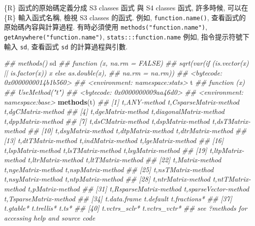 \documentclass[
]{book}
\newenvironment{Shaded}{\begin{snugshade}}{\end{snugshade}}
\newcommand{\CommentTok}[1]{\textcolor[rgb]{0.56,0.35,0.01}{\textit{#1}}}
\newcommand{\KeywordTok}[1]{\textcolor[rgb]{0.13,0.29,0.53}{\textbf{#1}}}
\newcommand{\NormalTok}[1]{#1}
\begin{document}
\{R\} 函式的原始碼定義分成
S3 classes 函式 與 S4 classes 函式,
許多時候, 可以在 \{R\} 輸入函式名稱,
檢視 S3 classes 的函式.
例如,
\texttt{function.name()},
查看函式的原始碼內容與計算過程.
有時必須使用 \texttt{methods("function.name")},
\texttt{getAnywhere("function.name")},
\texttt{stats:::function.name}
例如,
指令提示符號下輸入 \texttt{sd},
查看函式 \texttt{sd} 的計算過程與引數.

\begin{Shaded}
\begin{Highlighting}[]
\CommentTok{\#\# methods()}
\NormalTok{sd}
\CommentTok{\#\# function (x, na.rm = FALSE) }
\CommentTok{\#\# sqrt(var(if (is.vector(x) || is.factor(x)) x else as.double(x), }
\CommentTok{\#\#     na.rm = na.rm))}
\CommentTok{\#\# \textless{}bytecode: 0x0000000014b1b560\textgreater{}}
\CommentTok{\#\# \textless{}environment: namespace:stats\textgreater{}}
\NormalTok{t}
\CommentTok{\#\# function (x) }
\CommentTok{\#\# UseMethod("t")}
\CommentTok{\#\# \textless{}bytecode: 0x0000000009aa46d0\textgreater{}}
\CommentTok{\#\# \textless{}environment: namespace:base\textgreater{}}
\KeywordTok{methods}\NormalTok{(t)}
\CommentTok{\#\#  [1] t,ANY{-}method            t,CsparseMatrix{-}method  t,dgCMatrix{-}method     }
\CommentTok{\#\#  [4] t,dgeMatrix{-}method      t,diagonalMatrix{-}method t,dppMatrix{-}method     }
\CommentTok{\#\#  [7] t,dsCMatrix{-}method      t,dspMatrix{-}method      t,dsTMatrix{-}method     }
\CommentTok{\#\# [10] t,dsyMatrix{-}method      t,dtpMatrix{-}method      t,dtrMatrix{-}method     }
\CommentTok{\#\# [13] t,dtTMatrix{-}method      t,indMatrix{-}method      t,lgeMatrix{-}method     }
\CommentTok{\#\# [16] t,lspMatrix{-}method      t,lsTMatrix{-}method      t,lsyMatrix{-}method     }
\CommentTok{\#\# [19] t,ltpMatrix{-}method      t,ltrMatrix{-}method      t,ltTMatrix{-}method     }
\CommentTok{\#\# [22] t,Matrix{-}method         t,ngeMatrix{-}method      t,nspMatrix{-}method     }
\CommentTok{\#\# [25] t,nsTMatrix{-}method      t,nsyMatrix{-}method      t,ntpMatrix{-}method     }
\CommentTok{\#\# [28] t,ntrMatrix{-}method      t,ntTMatrix{-}method      t,pMatrix{-}method       }
\CommentTok{\#\# [31] t,RsparseMatrix{-}method  t,sparseVector{-}method   t,TsparseMatrix{-}method }
\CommentTok{\#\# [34] t.data.frame            t.default               t.fractions*           }
\CommentTok{\#\# [37] t.gtable*               t.trellis*              t.ts*                  }
\CommentTok{\#\# [40] t.vctrs\_sclr*           t.vctrs\_vctr*          }
\CommentTok{\#\# see \textquotesingle{}?methods\textquotesingle{} for accessing help and source code}

\end{Highlighting}
\end{Shaded}
\end{document}
